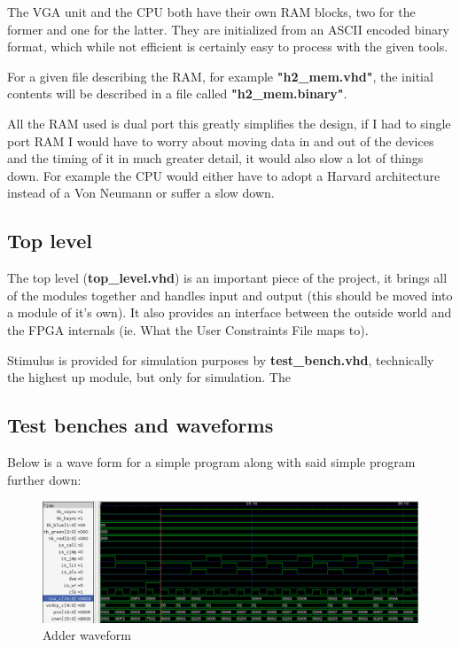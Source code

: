 \documentclass	[a4paper, 10pt]	{article}
\begin{document}
      The VGA unit and the CPU both have their own RAM blocks, two for the former and
      one for the latter. They are initialized from an ASCII encoded binary format,
      which while not efficient is certainly easy to process with the given tools.

      For a given file describing the RAM, for example \textbf{"h2\_mem.vhd"}, 
      the initial contents will be described in a file called \textbf{"h2\_mem.binary"}.

      All the RAM used is dual port this greatly simplifies the design, if I had to single
      port RAM I would have to worry about moving data in and out of the devices and the
      timing of it in much greater detail, it would also slow a lot of things down. For example
      the CPU would either have to adopt a Harvard architecture instead of a Von Neumann 
      or suffer a slow down.

    \subsection{Top level}

    The top level (\textbf{top\_level.vhd}) is an important piece of the project, it brings all of
    the modules together and handles input and output (this should be moved into a module
    of it's own). It also provides an interface between the outside world and the FPGA internals
    (ie. What the User Constraints File maps to).

    Stimulus is provided for simulation purposes by \textbf{test\_bench.vhd}, technically the
    highest up module, but only for simulation. The 

    \subsection{Test benches and waveforms}

      Below is a wave form for a simple program along with said simple program further down:

      \begin{figure}[ht]
        \hspace*{-3.5cm}
        \centering
        \includegraphics[width=1.6\textwidth]{pic/wav_adder.png}
        \caption{Adder waveform}
        \label{fig:Adder waveform}
      \end{figure}
      \FloatBarrier
\end{document}
